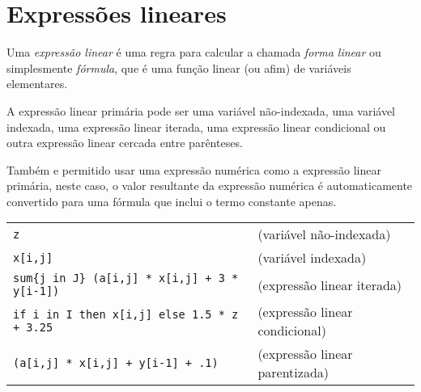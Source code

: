 \documentclass[11pt, brazil]{report}
\def\para#1{\noindent{\bf#1}}
\begin{document}

\newpage

\section{Expressões lineares}

Uma {\it expressão linear} é uma regra para calcular a chamada
{\it forma linear} ou simplesmente {\it fórmula}, que é uma função linear (ou
afim) de variáveis elementares.

A expressão linear primária pode ser uma variável não-indexada, uma
variável indexada, uma expressão linear iterada, uma expressão linear condicional
ou outra expressão linear cercada entre parênteses.

Também e permitido usar uma expressão numérica como a expressão linear
primária, neste caso, o valor resultante da expressão numérica
é automaticamente convertido para uma fórmula que inclui o
termo constante apenas.

\para{Exemplos}

%
%
%

\noindent
\begin{tabular}{@{}ll@{}}
\verb|z| &(variável não-indexada)\\
\verb|x[i,j]| &(variável indexada)\\
\verb|sum{j in J} (a[i,j] * x[i,j] + 3 * y[i-1])| &
(expressão linear iterada)\\
\verb|if i in I then x[i,j] else 1.5 * z + 3.25| &
(expressão linear condicional)\\
\verb|(a[i,j] * x[i,j] + y[i-1] + .1)| &
(expressão linear parentizada)\\
\end{tabular}

\end{document}
